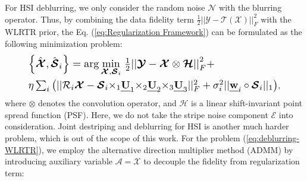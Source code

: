 \documentclass[twocolumn]{svjour3}          %
\begin{document}
    For HSI deblurring, we only consider the random noise ${\boldsymbol{\mathcal{N}}}$ with the blurring operator. Thus, by combining the data fidelity term $\frac{1}{2}||{\boldsymbol{\mathcal{Y}}} - {\mathcal{T}}({\boldsymbol{\mathcal{X}}})||_F^2$ with the WLRTR prior, the Eq. (\ref{eq:Regularization Framework}) can be formulated as the following minimization problem:
    \begin{equation}\label{eq:deblurring-WLRTR}
    \begin{aligned}
    \setlength{\abovedisplayskip}{2pt}
    \setlength{\belowdisplayskip}{2pt}
    &\resizebox{0.65\hsize}{!}{$\left\{ {\hat{\boldsymbol{\mathcal{X}}},{{\hat{\boldsymbol{\mathcal{S}}}}_i}} \right\} = \arg \mathop {\min }\limits_{{\boldsymbol{\mathcal{X}}},{{\boldsymbol{\mathcal{S}}}_i}} {\kern 1pt} \frac{1}{2}{\rm{||}}{\boldsymbol{\mathcal{Y}}} - {\boldsymbol{\mathcal{X}}} \otimes {\boldsymbol{\mathcal{H}}} {\rm{||}}_F^2 + $} \\
    &\resizebox{0.87\hsize}{!}{$ \eta \sum\nolimits_i {\left( {||{{\mathcal{R}}_i}{\boldsymbol{\mathcal{X}}} - {{\boldsymbol{\mathcal{S}}}_i}{ \times _1}{\textbf{\emph{U}}_1}{ \times _2}{\textbf{\emph{U}}_2}{ \times _3}{\textbf{\emph{U}}_3}||_F^2 + \sigma _i^2||{\textbf{\emph{w}}_i} \circ {{\boldsymbol{\mathcal{S}}}_i}|{|_1}} \right)}$},
    \end{aligned}
    \end{equation}
    where $\otimes$ denotes the convolution operator, and ${\boldsymbol{\mathcal{H}}}$ is a linear shift-invariant point spread function (PSF). Here, we do not take the stripe noise component ${\boldsymbol{\mathcal{E}}}$ into consideration. Joint destriping and deblurring for HSI is another much harder problem, which is out of the scope of this work. For the problem (\ref{eq:deblurring-WLRTR}), we employ the alternative direction multiplier method (ADMM) \cite{lin2011linearized} by introducing auxiliary variable ${\boldsymbol{\mathcal{A}}} = {\boldsymbol{\mathcal{X}}}$ to decouple the fidelity from regularization term:
\end{document}
